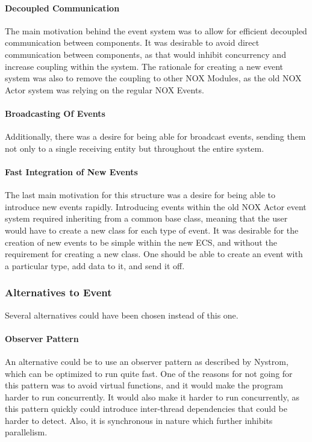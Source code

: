 \paragraph{Decoupled Communication}
The main motivation behind the event system was to allow for efficient decoupled communication between components.
It was desirable to avoid direct communication between components, as that would inhibit concurrency and increase coupling within the system.
The rationale for creating a new event system was also to remove the coupling to other NOX Modules, as the old NOX Actor system was relying on the regular NOX Events.

\paragraph{Broadcasting Of Events}
Additionally, there was a desire for being able for broadcast events, sending them not only to a single receiving entity but throughout the entire system.

\paragraph{Fast Integration of New Events}
The last main motivation for this structure was a desire for being able to introduce new events rapidly.
Introducing events within the old NOX Actor event system required inheriting from a common base class, meaning that the user would have to create a new class for each type of event.
It was desirable for the creation of new events to be simple within the new ECS, and without the requirement for creating a new class. 
One should be able to create an event with a particular type, add data to it, and send it off.

\subsubsection{Alternatives to Event}
Several alternatives could have been chosen instead of this one.

\paragraph{Observer Pattern}
An alternative could be to use an observer pattern as described by Nystrom\cite[Observer]{game_programming_patterns}, which can be optimized to run quite fast.
One of the reasons for not going for this pattern was to avoid virtual functions, and it would make the program harder to run concurrently.
It would also make it harder to run concurrently,
as this pattern quickly could introduce inter-thread dependencies
that could be harder to detect.
Also, it is synchronous in nature which further inhibits parallelism.

